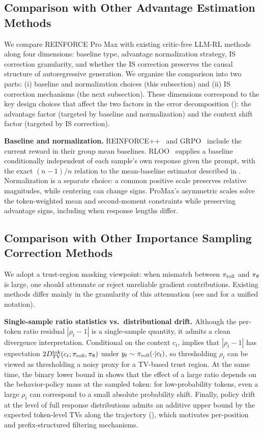 \subsection{Comparison with Other Advantage Estimation Methods}

We compare REINFORCE Pro Max with existing critic-free LLM-RL methods along four dimensions: baseline type, advantage normalization
strategy, IS correction granularity, and whether the IS correction preserves the causal structure of autoregressive generation. We
organize the comparison into two parts: (i) baseline and normalization choices (this subsection) and (ii) IS correction mechanisms (the
next subsection). These dimensions correspond to the key design choices that affect the two factors in the error decomposition
(): the advantage factor (targeted by baseline and normalization) and the context shift factor (targeted by IS
correction).

\textbf{Baseline and normalization.} REINFORCE++~\citep{hu2025reinforce} and GRPO~\citep{shao2024deepseekmath} include the current reward in
their group mean baselines. RLOO~\citep{ahmadian2024back} supplies a baseline conditionally independent of each sample's own response given the prompt, with the exact $(n-1)/n$ relation to the
mean-baseline estimator described in . Normalization is a separate choice: a common positive scale preserves relative
magnitudes, while centering can change signs. ProMax's asymmetric scales solve the token-weighted mean and second-moment constraints
while preserving advantage signs, including when response lengths differ.

\subsection{Comparison with Other Importance Sampling Correction Methods}

We adopt a trust-region masking viewpoint: when mismatch between $\pi_{\mathrm{roll}}$ and $\pi_{\theta}$ is large, one should attenuate or reject
unreliable gradient contributions. Existing methods differ mainly in the granularity of this attenuation (see  and
 for a unified notation).

\textbf{Single-sample ratio statistics vs.\ distributional drift.} Although the per-token ratio residual $|\rho_t-1|$ is a single-sample
quantity, it admits a clean divergence interpretation. Conditional on the context $c_t$,  implies that
$|\rho_t-1|$ has expectation $2D_{\mathrm{TV}}^{\mathrm{tok}}(c_t;\pi_{\mathrm{roll}},\pi_{\theta})$ under $y_t\sim\pi_{\mathrm{roll}}(\cdot|c_t)$, so thresholding $\rho_t$ can be viewed
as thresholding a noisy proxy for a TV-based trust region. At the same time, the binary lower bound in  shows
that the effect of a large ratio depends on the behavior-policy mass at the sampled token: for low-probability tokens, even a large
$\rho_t$ can correspond to a small absolute probability shift. Finally, policy drift at the level of full response distributions admits an
additive upper bound by the expected token-level TVs along the trajectory (), which motivates per-position and
prefix-structured filtering mechanisms.


